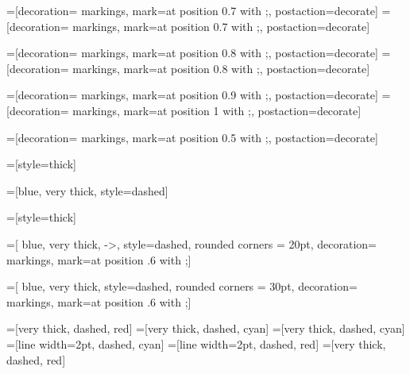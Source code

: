 =[decoration={ markings, mark=at position 0.7 with {\arrow[line width=\PathArrowLineWidth]{\PathArrowStyle};}}, postaction={decorate}]
=[decoration={ markings, mark=at position 0.7 with {\arrow[line width=0.7*\PathArrowLineWidth]{\PathArrowStyle};}}, postaction={decorate}]

=[decoration={ markings, mark=at position 0.8 with {\arrow[line width=\PathArrowLineWidth]{\PathArrowStyle};}}, postaction={decorate}]
=[decoration={ markings, mark=at position 0.8 with {\arrow[line width=0.7*\PathArrowLineWidth]{\PathArrowStyle};}}, postaction={decorate}]

=[decoration={ markings, mark=at position 0.9 with {\arrow[line width=\PathArrowLineWidth]{\PathArrowStyle};}}, postaction={decorate}]
=[decoration={ markings, mark=at position 1 with {\arrow[line width=\PathArrowLineWidth]{\PathArrowStyle};}}, postaction={decorate}]

=[decoration={ markings, mark=at position 0.5 with {;}}, postaction={decorate}]

=[style=thick]

=[blue, very thick, 
	style=dashed]

=[style=thick]

=[
	blue, very thick,%
	->, style=dashed, rounded corners = 20pt,
	decoration={ markings, mark=at position .6 with {;}}]
	 
=[
	blue, very thick, %
	style=dashed, rounded corners = 30pt,
	decoration={ markings, mark=at position .6 with {;}}]



=[very thick, dashed, red]
=[very thick, dashed, cyan]
=[very thick, dashed, cyan]
=[line width=2pt, dashed, cyan]
=[line width=2pt, dashed, red]
=[very thick, dashed, red]
\newcommand\TikzPunctureSize{0.04}
\newcommand\TikzPointSize{0.03}
\newcommand\TikzIntersectionSize{0.03}

